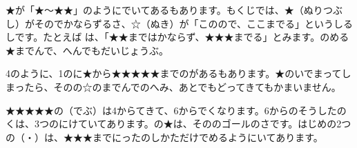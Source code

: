 ★が「★〜★★」のようにでいてあるもあります。もくじでは、★（ぬりつぶし）がそのでかならずるさ、☆（ぬき）が「このので、ここまでる」というしるしです。たとえば  は、「★★まではかならず、★★★までる」とみます。のめる★までんで、へんでもだいじょうぶ。



4のように、1のに★から★★★★★までのがあるもあります。★のいでまってしまったら、そのの☆のまでんでのへみ、あとでもどってきてもかまいません。


★★★★★の（でぶ）は4からてきて、6からでくなります。6からのそうしたのくは、3つのにけていてあります。の★は、そののゴールのさです。はじめの2つの（・）は、★★★までにったのしかただけでめるようにいてあります。

